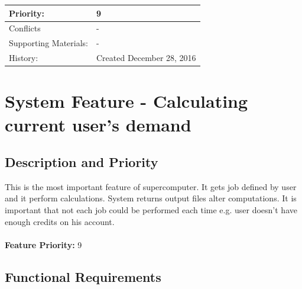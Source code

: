 \documentclass{scrreprt}
\begin{document}
\begin{table}[h!]
\begin{tabular}{|l|l|}
Priority:             & 9                                                                                                                                                                                                                                                                             \\ \hline
Conflicts             & -                                                                                                                                                                                                                                                                             \\ \hline
Supporting Materials: & -                                                                                                                                                                                                                                                                             \\ \hline
History:              & Created December 28, 2016                                                                                                                                                                                                                                                     \\ \hline
\end{tabular}
\end{table}
\FloatBarrier

\section{System Feature - Calculating current user's demand }



\subsection{Description and Priority}
This is the most important feature of supercomputer. It gets job defined by user and it perform calculations. System returns output files alter computations. It is important that not each job could be performed each time e.g. user doesn't have enough credits on his account.
\\
\\
\textbf{Feature Priority: } 9

\subsection{Functional Requirements}
\end{document}
